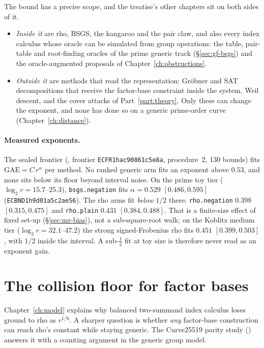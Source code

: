 The bound has a precise scope, and the treatise's other chapters sit on
both sides of it.
\begin{itemize}
\item \emph{Inside it} are rho, BSGS, the kangaroo and the pair claw, and
  also every index calculus whose oracle can be simulated from group
  operations: the table, pair-table and root-finding oracles of the prime
  generic track (\S\ref{sec:gf-bsgs}) and the oracle-augmented proposals of
  Chapter~\ref{ch:obstructions}.
\item \emph{Outside it} are methods that read the representation: Gr\"obner
  and SAT decompositions that receive the factor-base constraint inside the
  system, Weil descent, and the cover attacks of
  Part~\ref{part:theory}. Only these can change the exponent, and none has
  done so on a generic prime-order curve (Chapter~\ref{ch:distance}).
\end{itemize}

\paragraph{Measured exponents.} The sealed frontier
(, frontier \texttt{ECFR1hac90861c5e8a},
procedure~2, 130 bounds) fits $\text{GAE}=C\,r^\alpha$ per method. No ranked generic arm fits an exponent above $0.53$, and none sits below its floor
beyond interval noise. On the prime toy tier ($\log_2 r=15.7$--$25.3$),
\texttt{bsgs.negation} fits $\alpha=0.529$ $[0.486,0.595]$
(\texttt{ECBND1h9d01a5c2ae56}). The rho arms fit \emph{below} $1/2$ there:
\texttt{rho.negation} $0.398$ $[0.315,0.475]$ and \texttt{rho.plain}
$0.431$ $[0.384,0.488]$. That is a finite-size effect of fixed set-up
(\S\ref{sec:mr-bias}), not a sub-square-root walk; on the Koblitz medium
tier ($\log_2 r=32.1$--$47.2$) the strong signed-Frobenius rho fits
$0.451$ $[0.399,0.503]$, with $1/2$ inside the interval. A sub-$\tfrac12$
fit at toy size is therefore never read as an exponent gain.

\section{The collision floor for factor bases}\label{sec:gf-collision}

Chapter~\ref{ch:model} explains why balanced two-summand index calculus
loses ground to rho as $r^{1/6}$. A sharper question is whether \emph{any}
factor-base construction can reach rho's constant while staying generic.
The Curve25519 parity study
() answers it with a
counting argument in the generic group model.

